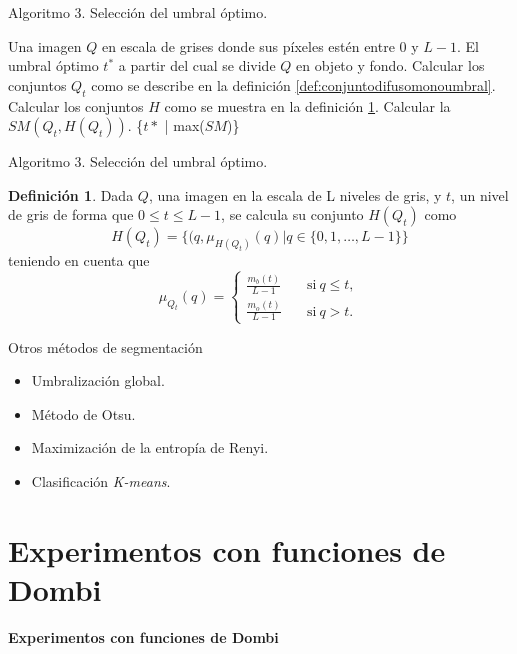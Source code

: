 \documentclass{beamer}
\theoremstyle{plain} %
\theoremstyle{definition}
\newtheorem{defn}{Definición}
\begin{document}
\begin{frame}{Algoritmo 3. Selección del umbral óptimo.}
  \begin{algorithm}[H]%
  \begin{algorithmic}[1]
  \REQUIRE Una imagen $Q$ en escala de grises donde sus píxeles estén entre $0$ y $L-1$.
  \ENSURE El umbral óptimo $t^*$ a partir del cual se divide $Q$ en objeto y fondo.
  \STATE Calcular los conjuntos $Q_t$ como se describe en la definición \ref{def:conjuntodifusomonoumbral}.
  \STATE Calcular los conjuntos $H$ como se muestra en la definición \ref{def:conjuntoHmonoumbral}.
  \STATE Calcular la $SM(Q_t, H(Q_t))$.
  \ENDFOR
  \RETURN \{$t*$ | max($SM$)\}
  \end{algorithmic}
  \caption{Selección del umbral óptimo}\label{alg:algoritmo3}
  \end{algorithm}
\end{frame}

\begin{frame}{Algoritmo 3. Selección del umbral óptimo.}
  \begin{defn}\label{def:conjuntoHmonoumbral}
  Dada $Q$, una imagen en la escala de L niveles de gris, y $t$, un nivel de gris de forma que $0\leq t\leq L-1$, se calcula su conjunto $H(Q_t)$ como
  $$H(Q_t) = \{(q, \mu_{H(Q_t)}(q)|q\in \{0,1,\dots, L-1\}\}$$
  teniendo en cuenta que
  $$\mu_{Q_t}(q) = \left\{ \begin{aligned}
      \frac{m_b(t)}{L-1} & \quad\text{si}\ q\leq t,\\
      \frac{m_o(t)}{L-1} & \quad\text{si}\ q> t.
   \end{aligned}\right.$$
   \end{defn}
\end{frame}

\begin{frame}{Otros métodos de segmentación}
  \begin{itemize}
    \item Umbralización global.
    \item Método de Otsu.
    \item Maximización de la entropía de Renyi.
    \item Clasificación {\em K-means}.
  \end{itemize}
\end{frame}

\section{Experimentos con funciones de Dombi}
\begin{frame}
  \bfseries\Large\centering  Experimentos con funciones de Dombi
\end{frame}
\end{document}
